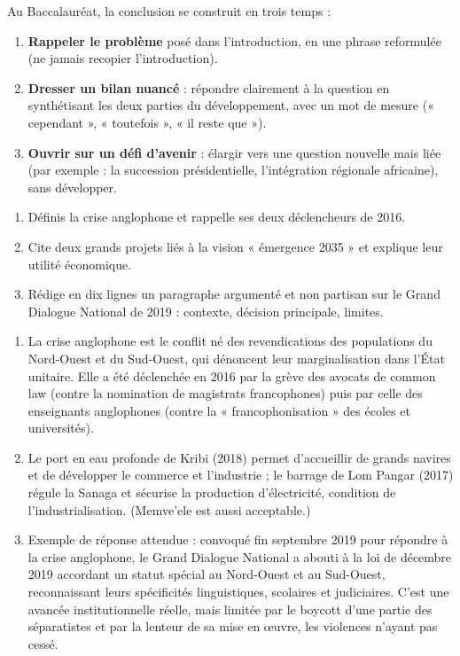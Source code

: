 \documentclass[11pt]{article}
\begin{document}
\begin{methode}
Au Baccalauréat, la conclusion se construit en trois temps :
\begin{enumerate}
\item \textbf{Rappeler le problème} posé dans l'introduction, en une phrase reformulée (ne jamais recopier l'introduction).
\item \textbf{Dresser un bilan nuancé} : répondre clairement à la question en synthétisant les deux parties du développement, avec un mot de mesure (« cependant », « toutefois », « il reste que »).
\item \textbf{Ouvrir sur un défi d'avenir} : élargir vers une question nouvelle mais liée (par exemple : la succession présidentielle, l'intégration régionale africaine), sans développer.
\end{enumerate}
\end{methode}

\begin{exercice}
\begin{enumerate}
\item Définis la crise anglophone et rappelle ses deux déclencheurs de 2016.
\item Cite deux grands projets liés à la vision « émergence 2035 » et explique leur utilité économique.
\item Rédige en dix lignes un paragraphe argumenté et non partisan sur le Grand Dialogue National de 2019 : contexte, décision principale, limites.
\end{enumerate}
\end{exercice}

\begin{corrige}[Exercice]
\begin{enumerate}
\item La crise anglophone est le conflit né des revendications des populations du Nord-Ouest et du Sud-Ouest, qui dénoncent leur marginalisation dans l'État unitaire. Elle a été déclenchée en 2016 par la grève des avocats de common law (contre la nomination de magistrats francophones) puis par celle des enseignants anglophones (contre la « francophonisation » des écoles et universités).
\item Le port en eau profonde de Kribi (2018) permet d'accueillir de grands navires et de développer le commerce et l'industrie ; le barrage de Lom Pangar (2017) régule la Sanaga et sécurise la production d'électricité, condition de l'industrialisation. (Memve'ele est aussi acceptable.)
\item Exemple de réponse attendue : convoqué fin septembre 2019 pour répondre à la crise anglophone, le Grand Dialogue National a abouti à la loi de décembre 2019 accordant un statut spécial au Nord-Ouest et au Sud-Ouest, reconnaissant leurs spécificités linguistiques, scolaires et judiciaires. C'est une avancée institutionnelle réelle, mais limitée par le boycott d'une partie des séparatistes et par la lenteur de sa mise en œuvre, les violences n'ayant pas cessé.
\end{enumerate}
\end{corrige}
\end{document}
